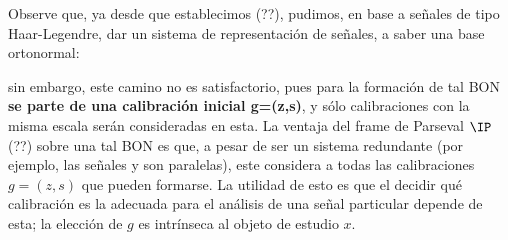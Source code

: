 Observe que, ya desde que establecimos (??), pudimos, en base a señales de tipo Haar-Legendre,
dar un sistema de representación de señales, a saber una base ortonormal:

sin embargo, este camino no es satisfactorio, pues para la formación de tal BON
\textbf{se parte de una calibración inicial g=(z,s)}, y sólo calibraciones con la misma escala
serán consideradas en esta. La ventaja del frame de Parseval $\IP$ (??)
sobre una tal BON es que, a pesar de ser un sistema redundante (por ejemplo, las señales
 y  son paralelas), este considera a todas las calibraciones $g=(z,s)$ que pueden formarse.
La utilidad de esto es que el decidir qué calibración es la adecuada para
el análisis de una señal particular depende de esta; la elección de $g$ es intrínseca
al objeto de estudio $x$.
